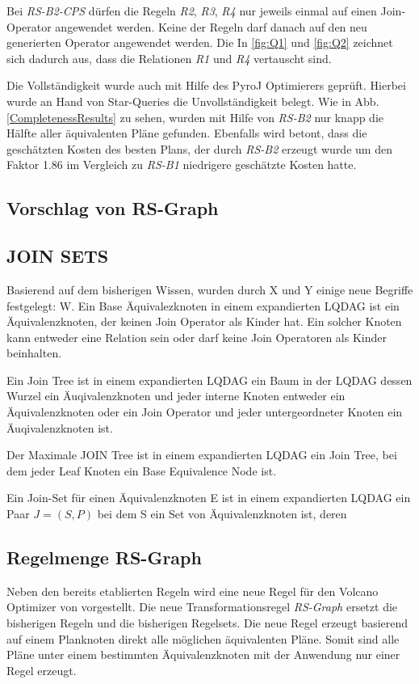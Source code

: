 Bei \textit{RS-B2-CPS} dürfen die Regeln \textit{R2}, \textit{R3}, \textit{R4} nur jeweils einmal auf einen Join-Operator angewendet werden. Keine der Regeln darf danach auf den neu generierten Operator angewendet werden. Die In \ref{fig:Q1} und \ref{fig:Q2} zeichnet sich dadurch aus, dass die Relationen \textit{R1} und \textit{R4} vertauscht sind.


Die Vollständigkeit wurde auch mit Hilfe des PyroJ Optimierers geprüft. Hierbei wurde an Hand von Star-Queries  die Unvollständigkeit belegt. Wie in Abb. \ref{CompletenessResults} zu sehen, wurden mit Hilfe von \textit{RS-B2} nur knapp die Hälfte aller äquivalenten Pläne gefunden. Ebenfalls wird betont, dass die geschätzten Kosten des besten Plans, der durch \textit{RS-B2} erzeugt wurde um den Faktor 1.86 im Vergleich zu \textit{RS-B1} niedrigere geschätzte Kosten hatte.







\subsection{Vorschlag von RS-Graph}

\subsection{JOIN SETS}

Basierend auf dem bisherigen Wissen, wurden durch X und Y einige neue Begriffe festgelegt: W.
Ein Base Äquivalezknoten in einem expandierten LQDAG ist ein Äquivalenzknoten, der keinen Join Operator als Kinder hat. Ein solcher Knoten kann entweder eine Relation sein oder darf keine Join Operatoren als Kinder beinhalten.

Ein Join Tree ist in einem expandierten LQDAG ein Baum in der LQDAG dessen Wurzel ein Äuqivalenzknoten und jeder interne Knoten entweder ein Äquivalenzknoten oder ein Join Operator und jeder untergeordneter Knoten ein Äuqivalenzknoten ist.

Der Maximale JOIN Tree ist in einem expandierten LQDAG ein Join Tree, bei dem jeder Leaf Knoten ein Base Equivalence Node ist.

Ein Join-Set für einen Äquivalenzknoten E ist in einem expandierten LQDAG ein Paar $J = (S, P)$ bei dem S ein Set von Äquivalenzknoten ist, deren 

\subsection{Regelmenge RS-Graph}
Neben den bereits etablierten Regeln wird eine neue Regel für den Volcano Optimizer von \cite{shanbhag2014optimizing} vorgestellt. Die neue Transformationsregel \emph{RS-Graph} ersetzt die bisherigen Regeln und die bisherigen Regelsets. Die neue Regel erzeugt basierend auf einem Planknoten direkt alle möglichen äquivalenten Pläne. Somit sind alle Pläne unter einem bestimmten Äquivalenzknoten mit der Anwendung nur einer Regel erzeugt.

